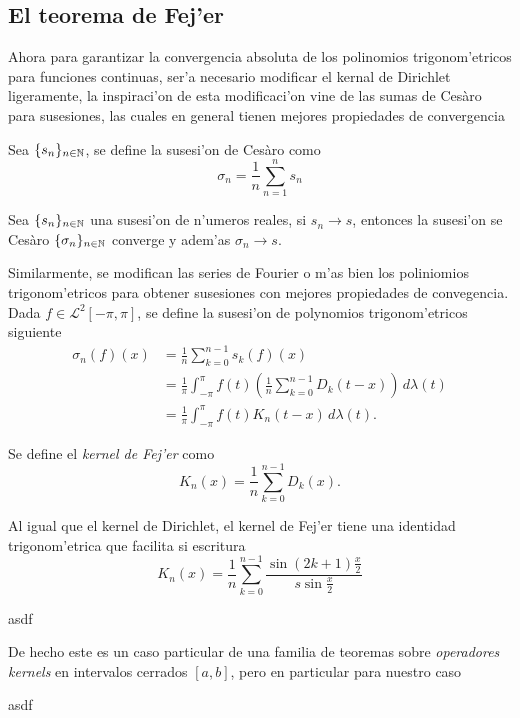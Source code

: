 \documentclass[main.tex]{subfiles}
\begin{document}
    \subsection{El teorema de Fej'er}
    \noindent Ahora para garantizar la convergencia absoluta de los polinomios trigonom'etricos para funciones continuas, ser'a necesario modificar el kernal de Dirichlet ligeramente, la inspiraci'on de esta modificaci'on vine de las sumas de Ces\`aro para susesiones, las cuales en general tienen mejores propiedades de convergencia
    \begin{def.}
      Sea \(\{s_{n}\}_{n\in \mathbb N }\), se define la susesi'on de Ces\`aro como
      \[
        \sigma_{n}=\frac{1}{n}\sum_{n=1}^{n}s_{n}
      \]
      \end{def.}
    \begin{teorema}
      Sea \(\{s_{n}\}_{n\in \mathbb N }\) una susesi'on de n'umeros reales, si \(s_{n}\to s\), entonces la susesi'on se Ces\`aro \(\{\sigma_{n}\}_{n\in \mathbb N }\) converge y adem'as \(\sigma_{n}\to s\).
    \end{teorema}
    Similarmente, se modifican las series de Fourier o m'as bien los poliniomios trigonom'etricos para obtener susesiones con mejores propiedades de convegencia. Dada \(f\in\mathcal{L}^{2}[-\pi,\pi]\), se define la susesi'on de polynomios trigonom'etricos siguiente
    \begin{align*}
      \sigma_{n}(f)(x)&=\frac{1}{n}\sum_{k=0}^{n-1}s_{k}(f)(x)\\
      &=\frac{1}{\pi}\int_{-\pi}^{\pi} f(t)\left(\frac{1}{n}\sum_{k=0}^{n-1}D_{k}(t-x)\right)\,d\lambda(t)\\
      &=\frac{1}{\pi}\int_{-\pi}^{\pi} f(t)K_{n}(t-x)\,d\lambda(t).
    \end{align*}
    \begin{def.}
      Se define el \emph{kernel de Fej'er} como
      \[
        K_{n}(x)=\frac{1}{n}\sum_{k=0}^{n-1}D_{k}(x).
      \]
    \end{def.}
    Al igual que el kernel de Dirichlet, el kernel de Fej'er tiene una identidad trigonom'etrica que facilita si escritura
    \[
      K_{n}(x)=\frac{1}{n}\sum_{k=0}^{n-1}\frac{\sin(2k+1)\frac{x}{2}}{s\sin\frac{x}{2}}
    \]
    \begin{teorema}
      asdf
    \end{teorema}
    De hecho este es un caso particular de una familia de teoremas sobre \emph{operadores kernels} en intervalos cerrados \([a,b]\), pero en particular para nuestro caso
    \begin{teorema}
      asdf
      \end{teorema}
  
\end{document}
